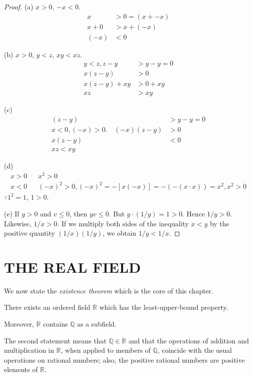 \begin{proof}
    (a) $x>0$, $-x<0$. 
    \begin{align*}
        x   &> 0=(x+-x)\\
        x+0 &> x+(-x)\\
        (-x)&<0
    \end{align*}

    (b) $x>0$, $y<z$, $xy<xz$.
    \begin{align*}
        y<z, z-y&>y-y=0\\
        x(z-y)&>0\\
        x(z-y)+xy&>0+xy\\
        xz&>xy
    \end{align*}

    (c)
    \begin{align*}
        (z-y) &>y-y=0\\
        x<0,(-x)>0.\quad (-x)(z-y)&>0 \\
        x(z-y) &<0\\
        xz<xy    
    \end{align*}

    (d)
    \begin{align*}
        x>0  && x^2    >0  \\
        x<0  &&(-x)^2 >0, (-x)^2 = -[x(-x)] = -(-(x\cdot x)) =x^2, x^2>0
    \end{align*}
    $\because 1^2=1$, $1>0$.

    (e)
    If $y>0$ and $v \leq 0$, then $yv \leq 0$. But $y \cdot (1/y)=1>0$. Hence $1/y > 0$.
    Likewise, $1/x > 0$. If we multiply both sides of the inequality $x <y$ by
    the positive quantity $(1/x)(1/y)$, we obtain $1/y <1/x$.
\end{proof}


\section{THE REAL FIELD}

We now state the \emph{existence theorem} which is the core of this chapter.

\begin{thm}\label{thm:1.19}
There exists an ordered field $\mathbb{R}$ which has the least-upper-bound
property.

Moreover, $\mathbb{R}$ contains $\mathbb{Q}$ as a subfield.
\end{thm}

The second statement means that $\mathbb{Q} \in \mathbb{R}$ and that the operations of
addition and multiplication in $\mathbb{R}$, when applied to members of $\mathbb{Q}$, coincide with
the usual operations on rational numbers; also, the positive rational numbers
are positive elements of $\mathbb{R}$.

